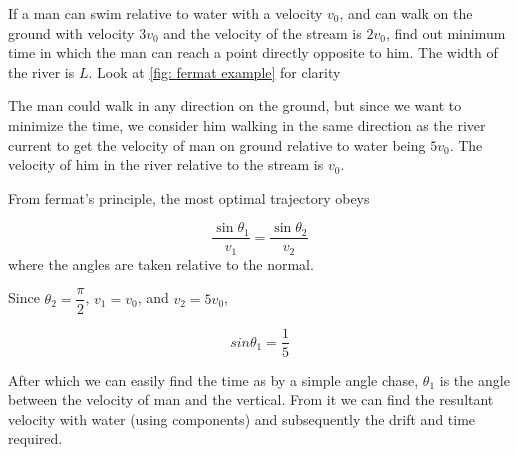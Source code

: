 \begin{example}
    If a man can swim relative to water with a velocity \(v_0\), and can walk on the ground 
    with velocity \(3v_0\) and the velocity of the stream is \(2v_0\), find out minimum time 
    in which the man can reach a point directly opposite to him. The width of the river is \(L\).
    Look at \cref{fig: fermat example} for clarity

    \begin{soln}
        The man could walk in any direction on the ground, but since we want to minimize 
        the time, we consider him walking in the same direction as the river current to get 
        the velocity of man on ground relative to water being \(5v_0\). The velocity 
        of him in the river relative to the stream is \(v_0\). 

        From fermat's principle, the most optimal trajectory obeys 
        
        \begin{equation*}
            \frac{\sin\theta_1}{v_1} = \frac{\sin\theta_2}{v_2}
        \end{equation*}
        where the angles are taken relative to the normal. 
        
        Since \(\theta_2 = \dfrac{\pi}{2}\), \(v_1 = v_0\), and \(v_2 = 5v_0\),

        \begin{equation*}
            sin\theta_1 = \frac{1}{5}
        \end{equation*}

        After which we can easily find the time as by a simple angle chase, \(\theta_1\) is 
        the angle between the velocity of man and the vertical. From it we 
        can find the resultant velocity with water (using components) 
        and subsequently the drift and time required.
    \end{soln}
\end{example}

